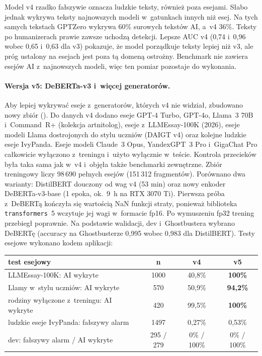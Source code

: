 Model v4 rzadko fałszywie oznacza ludzkie teksty, również poza esejami. Słabo jednak
wykrywa teksty najnowszych modeli w~gatunkach innych niż esej. Na tych samych tekstach GPTZero
wykrywa 60\% surowych tekstów AI, a~v4 36\%. Teksty po humanizerach prawie zawsze uchodzą
detekcji. Lepsze AUC v4 (0,74 i~0,96 wobec 0,65 i~0,63 dla v3) pokazuje, że model
porządkuje teksty lepiej niż v3, ale próg ustalony na esejach jest poza tą domeną ostrożny.
Benchmark nie zawiera esejów AI z~najnowszych modeli, więc ten pomiar pozostaje do wykonania.

\paragraph{Wersja v5: DeBERTa-v3 i~więcej generatorów.}
Aby lepiej wykrywać eseje z~generatorów, których v4 nie widział, zbudowano nowy zbiór
(). Do danych v4 dodano eseje GPT-4 Turbo, GPT-4o, Llama~3 70B
i~Command~R+ (kolekcja artnitolog), eseje z~LLMEssay-100K (2026), eseje modeli Llama dostrojonych
do stylu uczniów (DAIGT v4) oraz kolejne ludzkie eseje IvyPanda. Eseje modeli Claude~3 Opus,
YandexGPT~3 Pro i~GigaChat Pro całkowicie wyłączono z~treningu i~użyto wyłącznie w~teście.
Kontrola przecieków była taka sama jak w~v4 i~objęła także benchmarki zewnętrzne. Zbiór treningowy
liczy 98\,690 pełnych esejów (151\,312 fragmentów). Porównano dwa warianty: DistilBERT douczony od
wag v4 (53 min) oraz nowy enkoder DeBERTa-v3-base (1 epoka, ok.\ 9~h na RTX 3070 Ti). Pierwsza
próba z~DeBERTą kończyła się wartością NaN funkcji straty, ponieważ biblioteka \texttt{transformers}~5
wczytuje jej wagi w~formacie fp16. Po wymuszeniu fp32 trening przebiegł poprawnie. Na podstawie
walidacji, dev i~Ghostbustera wybrano DeBERTę (accuracy na Ghostbusterze 0,995 wobec 0,983 dla
DistilBERT). Testy esejowe wykonano kodem aplikacji:

\begin{center}
\small
\begin{tabular}{|l|c|c|c|}
\hline
test esejowy & n & v4 & v5 \\
\hline
LLMEssay-100K: AI wykryte & 1000 & 40,8\% & \textbf{100\%} \\
Llamy w~stylu uczniów: AI wykryte & 570 & 50,9\% & \textbf{94,2\%} \\
rodziny wyłączone z~treningu: AI wykryte & 420 & 99,5\% & \textbf{100\%} \\
ludzkie eseje IvyPanda: fałszywy alarm & 1497 & 0,27\% & 0,53\% \\
dev: fałszywy alarm / AI wykryte & 295 / 279 & 0\% / 100\% & 0\% / 100\% \\
\hline
\end{tabular}
\end{center}

